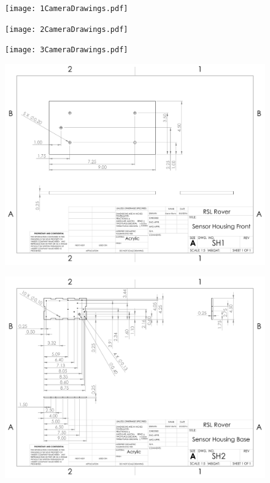 \begin{figure}[H]
	\centerline{\texttt{[image: 1CameraDrawings.pdf]}}
\end{figure}

\begin{figure}[H]
	\centerline{\texttt{[image: 2CameraDrawings.pdf]}}
\end{figure}

\begin{figure}[H]
	\centerline{\texttt{[image: 3CameraDrawings.pdf]}}
\end{figure}


\begin{figure}[H]
	\centerline{\includegraphics[angle=90,width=1.0\linewidth]{dwgs/SH1.pdf}}
\end{figure}

\begin{figure}[H]
	\centerline{\includegraphics[angle=90,width=1.0\linewidth]{dwgs/SH2.pdf}}
\end{figure}

